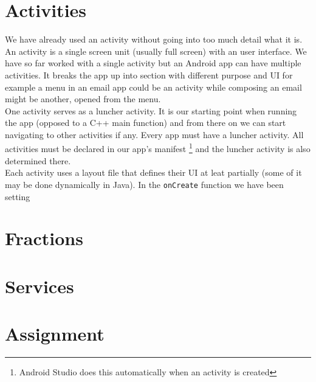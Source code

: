 \graphicspath{{./lab02/Images/}}


\maketocpage


\section{Activities}
We have already used an activity without going into too much detail what it is. An activity is a single screen unit (usually full screen) with an user interface. We have so far worked with a single activity but an Android app can have multiple activities. It breaks the app up into section with different purpose and UI for example a menu in an email app could be an activity while composing an email might be another, opened from the menu.\\

One activity serves as a luncher activity. It is our starting point when running the app (opposed to a C++ main function) and from there on we can start navigating to other activities if any. Every app must have a luncher activity. All activities must be declared in our app's manifest \footnote{Android Studio does this automatically when an activity is created} and the luncher activity is also determined there.\\

Each activity uses a layout file that defines their UI at leat partially (some of it may be done dynamically in Java). In the \texttt{onCreate} function we have been setting 


\section{Fractions}
\section{Services}

\section{Assignment}